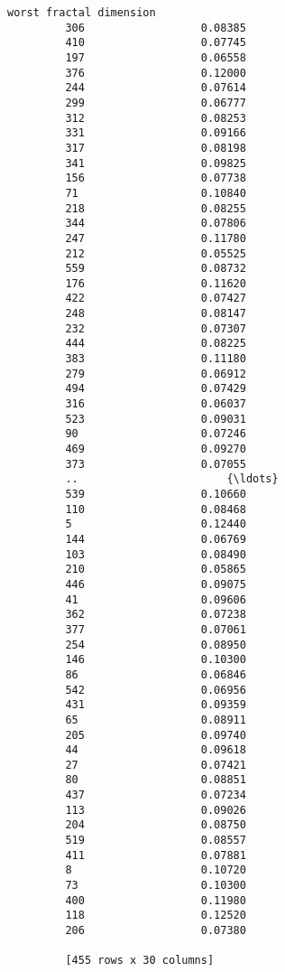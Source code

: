 \documentclass[11pt]{article}
\begin{document}
\begin{Verbatim}[commandchars=\\\{\}]
              worst fractal dimension  
         306                  0.08385  
         410                  0.07745  
         197                  0.06558  
         376                  0.12000  
         244                  0.07614  
         299                  0.06777  
         312                  0.08253  
         331                  0.09166  
         317                  0.08198  
         341                  0.09825  
         156                  0.07738  
         71                   0.10840  
         218                  0.08255  
         344                  0.07806  
         247                  0.11780  
         212                  0.05525  
         559                  0.08732  
         176                  0.11620  
         422                  0.07427  
         248                  0.08147  
         232                  0.07307  
         444                  0.08225  
         383                  0.11180  
         279                  0.06912  
         494                  0.07429  
         316                  0.06037  
         523                  0.09031  
         90                   0.07246  
         469                  0.09270  
         373                  0.07055  
         ..                       {\ldots}  
         539                  0.10660  
         110                  0.08468  
         5                    0.12440  
         144                  0.06769  
         103                  0.08490  
         210                  0.05865  
         446                  0.09075  
         41                   0.09606  
         362                  0.07238  
         377                  0.07061  
         254                  0.08950  
         146                  0.10300  
         86                   0.06846  
         542                  0.06956  
         431                  0.09359  
         65                   0.08911  
         205                  0.09740  
         44                   0.09618  
         27                   0.07421  
         80                   0.08851  
         437                  0.07234  
         113                  0.09026  
         204                  0.08750  
         519                  0.08557  
         411                  0.07881  
         8                    0.10720  
         73                   0.10300  
         400                  0.11980  
         118                  0.12520  
         206                  0.07380  
         
         [455 rows x 30 columns]
\end{Verbatim}
            
\end{document}
